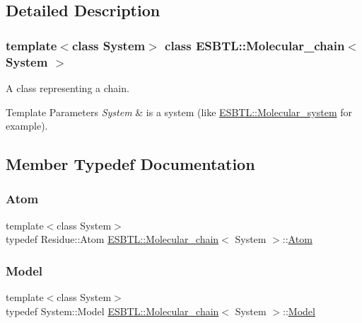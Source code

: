 \subsection{Detailed Description}
\subsubsection*{template$<$class System$>$\newline
class E\+S\+B\+T\+L\+::\+Molecular\+\_\+chain$<$ System $>$}

A class representing a chain. 
\begin{DoxyTemplParams}{Template Parameters}
{\em System} & is a system (like \hyperlink{classESBTL_1_1Molecular__system}{E\+S\+B\+T\+L\+::\+Molecular\+\_\+system} for example). \\
\hline
\end{DoxyTemplParams}


\subsection{Member Typedef Documentation}
\mbox{\label{classESBTL_1_1Molecular__chain_a53b9fe27aadbda89ae35802db0493405}} 
\subsubsection{\texorpdfstring{Atom}{Atom}}
{\footnotesize\ttfamily template$<$class System$>$ \\
typedef Residue\+::\+Atom \hyperlink{classESBTL_1_1Molecular__chain}{E\+S\+B\+T\+L\+::\+Molecular\+\_\+chain}$<$ System $>$\+::\hyperlink{classESBTL_1_1Molecular__chain_a53b9fe27aadbda89ae35802db0493405}{Atom}}

\mbox{\label{classESBTL_1_1Molecular__chain_a91de91fd0923cf2e00d947b76851be68}} 
\subsubsection{\texorpdfstring{Model}{Model}}
{\footnotesize\ttfamily template$<$class System$>$ \\
typedef System\+::\+Model \hyperlink{classESBTL_1_1Molecular__chain}{E\+S\+B\+T\+L\+::\+Molecular\+\_\+chain}$<$ System $>$\+::\hyperlink{classESBTL_1_1Molecular__chain_a91de91fd0923cf2e00d947b76851be68}{Model}}

